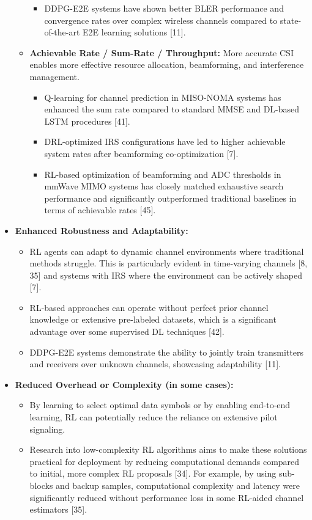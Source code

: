 \documentclass[journal,twocolumn]{IEEEtran}
\begin{document}
\begin{itemize}
\begin{itemize}
\begin{itemize}
                    \item DDPG-E2E systems have shown better BLER performance and convergence rates over complex wireless channels compared to state-of-the-art E2E learning solutions [11].
                \end{itemize}
            \item \textbf{Achievable Rate / Sum-Rate / Throughput:} More accurate CSI enables more effective resource allocation, beamforming, and interference management.
                \begin{itemize}
                    \item Q-learning for channel prediction in MISO-NOMA systems has enhanced the sum rate compared to standard MMSE and DL-based LSTM procedures [41].
                    \item DRL-optimized IRS configurations have led to higher achievable system rates after beamforming co-optimization [7].
                    \item RL-based optimization of beamforming and ADC thresholds in mmWave MIMO systems has closely matched exhaustive search performance and significantly outperformed traditional baselines in terms of achievable rates [45].
                \end{itemize}
        \end{itemize}
    \item \textbf{Enhanced Robustness and Adaptability:}
        \begin{itemize}
            \item RL agents can adapt to dynamic channel environments where traditional methods struggle. This is particularly evident in time-varying channels [8, 35] and systems with IRS where the environment can be actively shaped [7].
            \item RL-based approaches can operate without perfect prior channel knowledge or extensive pre-labeled datasets, which is a significant advantage over some supervised DL techniques [42].
            \item DDPG-E2E systems demonstrate the ability to jointly train transmitters and receivers over unknown channels, showcasing adaptability [11].
        \end{itemize}
    \item \textbf{Reduced Overhead or Complexity (in some cases):}
        \begin{itemize}
            \item By learning to select optimal data symbols or by enabling end-to-end learning, RL can potentially reduce the reliance on extensive pilot signaling.
            \item Research into low-complexity RL algorithms aims to make these solutions practical for deployment by reducing computational demands compared to initial, more complex RL proposals [34]. For example, by using sub-blocks and backup samples, computational complexity and latency were significantly reduced without performance loss in some RL-aided channel estimators [35].
        \end{itemize}
\end{itemize}
\end{document}
